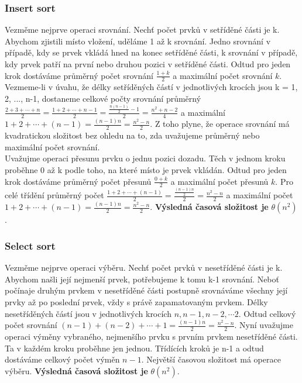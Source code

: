 \documentclass[10pt,a4paper]{article}
\begin{document}
\subsubsection{Insert sort}
Vezměme nejprve operaci srovnání. Nechť počet prvků v setříděné části je k. Abychom zjistili místo vložení, uděláme 1 až k srovnání. Jedno srovnání v případě, kdy se prvek vkládá hned na konec setříděné části, k srovnání v případě, kdy prvek patří na první nebo druhou pozici v setříděné části. Odtud pro jeden krok dostáváme průměrný počet srovnání $\frac{1+k}{2}$ a maximální počet srovnání $k$. Vezmeme-li v úvahu, že délky setříděných částí v jednotlivých krocích jsou k = 1, 2, ..., n-1, dostaneme celkové počty srovnání průměrný $\frac{2+3+\cdots+n}{2} = \frac{1+2+\cdots+n-1}{2} = \frac{\frac{n(n-1)}{2}-1}{2} = \frac{n^2+n-2}{4}$ a maximální $1+2+\cdots+(n-1) = \frac{(n-1)n}{2} = \frac{n^2-n}{2}$. Z toho plyne, že operace srovnání má kvadratickou složitost bez ohledu na to, zda uvažujeme průměrný nebo maximální počet srovnání. \\
Uvažujme operaci přesunu prvku o jednu pozici dozadu. Těch v jednom kroku proběhne 0 až k podle toho, na které místo je prvek vkládán. Odtud pro jeden krok dostáváme průměrný počet přesunů $\frac{0+k}{2}$ a maximální počet přesunů $k$. Pro celé třídění průměrný počet $\frac{1+2+\cdots+(n-1)}{2} = \frac{\frac{(n-1)n}{2}}{2} = \frac{n^2-n}{2}$ a maximální počet $1+2+\cdots+(n-1) = \frac{(n-1)n}{2} = \frac{n^2-n}{2}$. \textbf{Výsledná časová složitost je} $\theta (n^2)$.

\subsubsection{Select sort}
Vezměme nejprve operaci výběru. Nechť počet prvků v nesetříděné části je k. Abychom našli její nejmenší prvek, potřebujeme k tomu k-1 srovnání. Neboť počínaje druhým prvkem v nesetříděné části postupně srovnáváme všechny její prvky až po poslední prvek, vždy s právě zapamatovaným prvkem. Délky nesetříděných částí jsou v jednotlivých krocích $n, n-1, n-2, \cdots 2$. Odtud celkový počet srovnání $(n-1) + (n-2) + \cdots + 1 = \frac{(n-1)n}{2} = \frac{n^2-n}{2}$. Nyní uvažujme operaci výměny vybraného, nejmenšího prvku s prvním prvkem nesetříděné části. Ta v každém kroku proběhne jen jednou. Třídících kroků je n-1 a odtud dostáváme celkový počet výměn $n-1$. Největší časovou složitost má operace výběru. \textbf{Výsledná časová složitost je} $\theta (n^2)$.
\end{document}
